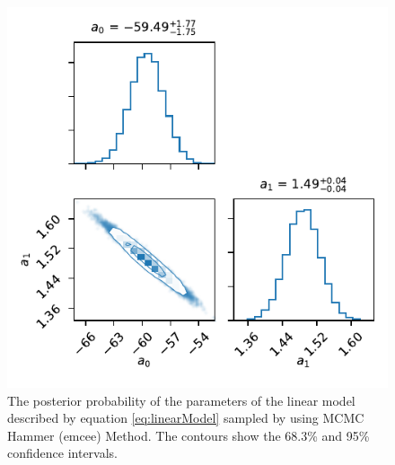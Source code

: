 \begin{figure}
    \centering
    \includegraphics{CodeAndFigures/LinearModelEmcee.pdf}
    \caption{The posterior probability of the parameters of the linear model described by equation \ref{eq:linearModel} sampled by using MCMC Hammer (emcee) Method. The contours show the 68.3\% and 95\% confidence intervals.}
    \label{fig:linearEmcee}
\end{figure}

